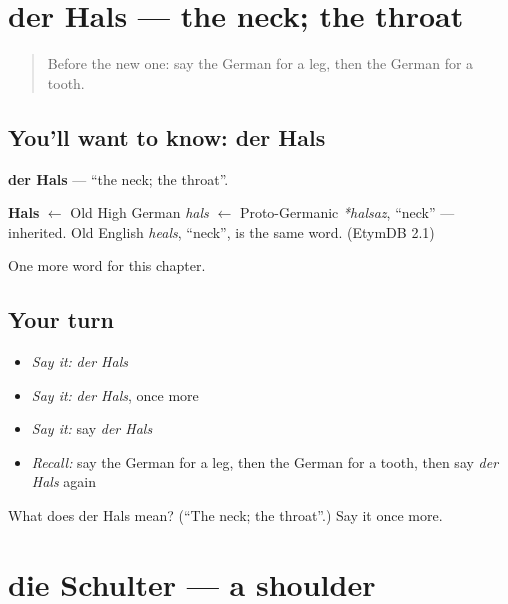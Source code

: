 \section[der Hals]{der Hals — the neck; the throat}

\label{lesson:GE-C56-hals}



\begin{quote}
Before the new one: say the German for a leg, then the German for a tooth.
\end{quote}

\subsection*{You'll want to know: der Hals}
\textbf{der Hals} — \textquotedblleft{}the neck; the throat\textquotedblright{}.

\begin{cousinweb}
\textbf{Hals} $\leftarrow$ Old High German \emph{hals} $\leftarrow$ Proto-Germanic \emph{*halsaz}, \textquotedblleft{}neck\textquotedblright{} — inherited. Old English \emph{heals}, \textquotedblleft{}neck\textquotedblright{}, is the same word. (EtymDB 2.1)
\end{cousinweb}

\begin{grammarlens}[title={What you've built}]
One more word for this chapter.
\end{grammarlens}

\subsection*{Your turn}
\begin{itemize}
\raggedright
  \item \emph{Say it:} \emph{der Hals}
  \item \emph{Say it:} \emph{der Hals}, once more
  \item \emph{Say it:} say \emph{der Hals}
  \item \emph{Recall:} say the German for a leg, then the German for a tooth, then say \emph{der Hals} again
\end{itemize}

\begin{tcolorbox}[breakable,colback=teal!4,colframe=teal!35!black,title={Before you move on}]
What does der Hals mean? (\textquotedblleft{}The neck; the throat\textquotedblright{}.) Say it once more.
\end{tcolorbox}
\section[die Schulter]{die Schulter — a shoulder}

